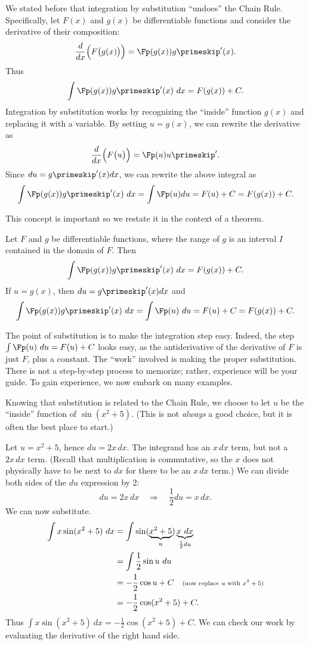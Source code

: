 We stated before that integration by substitution ``undoes'' the Chain Rule. Specifically, let $F(x)$ and $g(x)$ be differentiable functions and consider the derivative of their composition:
\[\frac{d}{dx}\Big(F\big(g(x)\big)\Big) = \Fp(g(x))g\primeskip'(x).\]
Thus 
\[\int \Fp(g(x))g\primeskip'(x)\ dx = F(g(x)) + C.\]
Integration by substitution works by recognizing the ``inside'' function $g(x)$ and replacing it with a variable. By setting $u=g(x)$, we can rewrite the derivative as
\[\frac{d}{dx}\Big(F\big(u\big)\Big) = \Fp(u)u\primeskip'.\]
Since $du = g\primeskip'(x)dx$, we can rewrite the above integral as
\[\int \Fp(g(x))g\primeskip'(x)\ dx = \int \Fp(u) du = F(u)+C = F(g(x))+ C.\]
	
This concept is important so we restate it in the context of a theorem.

\begin{theorem}\label{thm:subst}
Let $F$ and $g$ be differentiable functions, where the range of $g$ is an interval $I$ contained in the domain of $F$. Then 
\[\int \Fp(g(x))g\primeskip'(x)\ dx = F(g(x)) + C.\]
If $u = g(x)$, then $du = g\primeskip'(x)dx$ and 
\[\int \Fp(g(x))g\primeskip'(x)\ dx = \int \Fp(u)\ du = F(u)+C = F(g(x))+C.\]
\end{theorem}

The point of substitution is to make the integration step easy. Indeed, the step $\int \Fp(u)\ du = F(u) + C$ looks easy, as the antiderivative of the derivative of $F$ is just $F$, plus a constant. The ``work'' involved is making the proper substitution. There is not a step-by-step process to memorize; rather, experience will be your guide. To gain experience, we now embark on many examples.\\


{Knowing that substitution is related to the Chain Rule, we choose to let $u$ be the ``inside'' function of $\sin(x^2+5)$. (This is not \emph{always} a good choice, but it is often the best place to start.)

Let $u = x^2+5$, hence $du = 2x\,dx$. The integrand has an $x\,dx$ term, but not a $2x\,dx$ term. (Recall that multiplication is commutative, so the $x$ does not physically have to be next to $dx$ for there to be an $x\,dx$ term.) We can divide both sides of the $du$ expression by 2:
\[du = 2x\,dx \quad \Rightarrow \quad \frac12du = x\,dx.\]
We can now substitute.
\begin{align*}
	\int x\sin(x^2+5)\ dx
	&= \int \sin(\underbrace{x^2+5}_u) \underbrace{x\ dx}_{\frac12du}\\
	&= \int \frac12\sin u\ du \\
	&= -\frac12\cos u + C \quad \text{\scriptsize (now replace $u$ with $x^2+5$)}\\
	&=-\frac12\cos(x^2+5) + C.
\end{align*}
Thus $\int x\sin(x^2+5)\ dx = -\frac12\cos(x^2+5)+C$. We can check our work by evaluating the derivative of the right hand side.}

